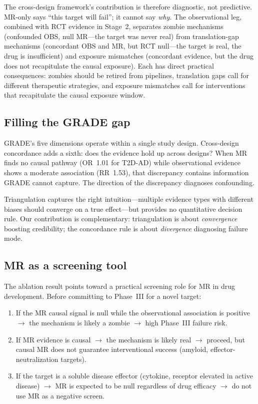 \documentclass[11pt]{article}
\begin{document}
The cross-design framework's contribution is therefore diagnostic, not predictive. MR-only says ``this target will fail''; it cannot say \emph{why}. The observational leg, combined with RCT evidence in Stage~2, separates zombie mechanisms (confounded OBS, null MR---the target was never real) from translation-gap mechanisms (concordant OBS and MR, but RCT null---the target is real, the drug is insufficient) and exposure mismatches (concordant evidence, but the drug does not recapitulate the causal exposure). Each has direct practical consequences: zombies should be retired from pipelines, translation gaps call for different therapeutic strategies, and exposure mismatches call for interventions that recapitulate the causal exposure window.

\subsection{Filling the GRADE gap}

GRADE's five dimensions operate within a single study design. Cross-design concordance adds a sixth: does the evidence hold up across designs? When MR finds no causal pathway (OR~1.01 for T2D-AD) while observational evidence shows a moderate association (RR~1.53), that discrepancy contains information GRADE cannot capture. The direction of the discrepancy diagnoses confounding.

Triangulation \cite{lawlor2016} captures the right intuition---multiple evidence types with different biases should converge on a true effect---but provides no quantitative decision rule. Our contribution is complementary: triangulation is about \emph{convergence} boosting credibility; the concordance rule is about \emph{divergence} diagnosing failure mode.

\subsection{MR as a screening tool}

The ablation result points toward a practical screening role for MR in drug development. Before committing to Phase~III for a novel target:

\begin{enumerate}
\item If the MR causal signal is null while the observational association is positive $\to$ the mechanism is likely a zombie $\to$ high Phase~III failure risk.
\item If MR evidence is causal $\to$ the mechanism is likely real $\to$ proceed, but causal MR does not guarantee interventional success (amyloid, effector-neutralization targets).
\item If the target is a soluble disease effector (cytokine, receptor elevated in active disease) $\to$ MR is expected to be null regardless of drug efficacy $\to$ do not use MR as a negative screen.
\end{enumerate}
\end{document}
